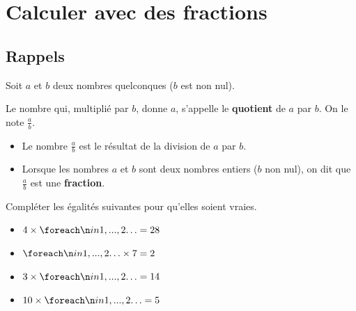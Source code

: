 \documentclass[a4paper]{book}
\begin{document}
\setcounter{chapter}{13}
\renewcommand{\monTitre}{Calculer avec des fractions}
\chapter{\monTitre}
\thispagestyle{fancy}


\section{Rappels}

    \begin{definition}
        Soit $a$ et $b$ deux nombres quelconques ($b$ est non nul).
        
        Le nombre qui, multiplié par $b$, donne $a$, s'appelle le \textbf{quotient} de $a$ par $b$. On le note $\frac{a}{b}$.
    \end{definition}
    
    
    \begin{remarque}
        \begin{itemize}
            \item Le nombre $\frac{a}{b}$ est le résultat de la division de $a$ par $b$.
            \item Lorsque les nombres $a$ et $b$ sont deux nombres entiers ($b$ non nul), on dit que $\frac{a}{b}$ est une \textbf{fraction}.
        \end{itemize}
    \end{remarque}
    
    
    \begin{exemple}
        Compléter les égalités suivantes pour qu'elles soient vraies.\medskip

        \begin{minipage}{0.49\linewidth}
            \begin{itemize}
                \item $4 \times \points[2] = 28$ \medskip
                \item $\points[2] \times 7 = 2$
            \end{itemize}
        \end{minipage}
        \hfill
        \begin{minipage}{0.49\linewidth}
            \begin{itemize}
                \item $3 \times \points[2] = 14$ \medskip
                \item $10 \times \points[2] = 5$
            \end{itemize}
        \end{minipage}
    \end{exemple}
    
\end{document}
